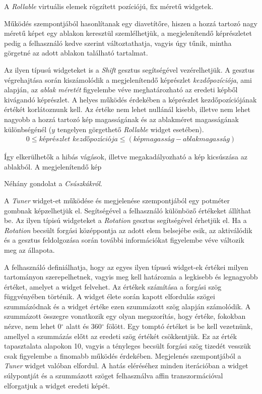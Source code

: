 
A \textit{Rollable} virtuális elemek rögzített pozíciójú, fix méretű widgetek.

Működés szempontjából hasonlítanak egy diavetítőre, hiszen a hozzá tartozó nagy méretű képet egy ablakon keresztül szemlélhetjük, a megjelenítendő képrészletet pedig a felhasználó kedve szerint változtathatja, vagyis úgy tűnik, mintha görgetné az adott ablakon található tartalmat.

Az ilyen típusú widgeteket is a \textit{Shift} gesztus segítségével vezérelhetjük. A gesztus végrehajtása során kiszámolódik a megjelenítendő képrészlet \textit{kezdőpozíciója}, ami alapján, az \textit{ablak méretét} figyelembe véve meghatározható az eredeti képből kivágandó képrészlet.
A helyes működés érdekében a képrészlet kezdőpozíciójának értékét korlátoznunk kell. Az értéke nem lehet nullánál kisebb, illetve nem lehet nagyobb a hozzá tartozó kép magasságának és az ablakméret magasságának különbségénél ($y$ tengelyen görgethető \textit{Rollable} widget esetében).
\begin{align*}
	0 \leq \textit{képrészlet kezdőpozíciója} \leq (\textit{képmagasság} - \textit{ablakmagasság})
\end{align*}

Így elkerülhetők a hibás vágások, illetve megakadályozható a kép kicsúszása az ablakból.
A megjelenítendő kép


Néhány gondolat a \textit{Csúszkákról}.


A \textit{Tuner} widget-et működése és megjelenése szempontjából egy potméter gombnak képzelhetjük el. Segítségével a felhasználó különböző értékeket állíthat be.
Az ilyen típisú widgeteket a \textit{Rotation} gesztus segítségével érhetjük el. Ha a \textit{Rotation} becsült forgási középpontja az adott elem belsejébe esik, az aktiválódik és a gesztus feldolgozása során további információkat figyelembe véve változik meg az állapota.

A felhasználó definiálhatja, hogy az egyes ilyen típusú widget-ek értékei milyen tartományon szerepelhetnek, vagyis meg kell határoznia a legkisebb és legnagyobb értéket, amelyet a widget felvehet. Az értékek számítása a forgási szög függvényében történik. A widget élete során kapott elfordulás szögei szummázódnak és a widget értéke ezen szummázott szög alapján számolódik. A szummázott összegre vonatkozik egy olyan megszorítás, hogy értéke, fokokban nézve, nem lehet 0$^{\circ}$ alatt és 360$^{\circ}$ fölött. Egy tomptó értéket is be kell vezetnünk, amellyel a szummázás előtt az eredeti szög értékét csökkentjük. Ez az érték tapasztalata alapokon 10, vagyis a tényleges becsült forgási szög tizedét vesszük csak figyelembe a finomabb működés érdekében.
Megjelenés szempontjából a \textit{Tuner} widget valóban elfordul. A hatás eléréséhez minden iterációban a widget súlypontját és a szummázott szöget felhasználva affin transzormációval elforgatjuk a widget eredeti képét.
